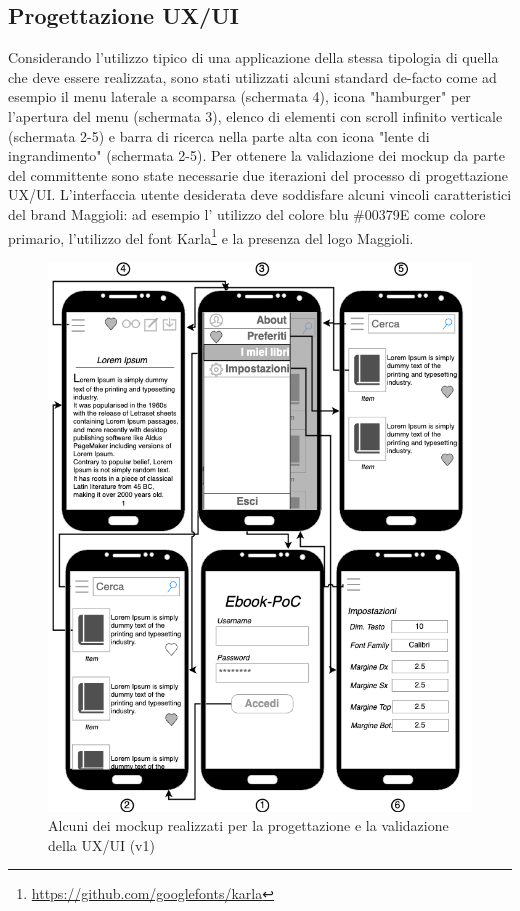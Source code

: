 \subsection{Progettazione UX/UI}
Considerando l'utilizzo tipico di una applicazione della stessa tipologia di quella che deve essere realizzata, sono stati utilizzati alcuni standard de-facto come ad esempio il menu laterale a scomparsa (schermata 4), icona "hamburger" per l'apertura del menu (schermata 3), elenco di elementi con scroll infinito verticale (schermata 2-5) e barra di ricerca nella parte alta con icona "lente di ingrandimento" (schermata 2-5). Per ottenere la validazione dei mockup da parte del committente sono state necessarie due iterazioni del processo di progettazione UX/UI. L'interfaccia utente desiderata deve soddisfare alcuni vincoli caratteristici del brand Maggioli: ad esempio l' utilizzo del colore blu \#00379E come colore primario, l'utilizzo del font Karla\footnote{\url{https://github.com/googlefonts/karla}} e la presenza del logo Maggioli.

\begin{figure}[H]
\centering
\includegraphics[width=1\textwidth]{img/tesi-14-mockup1.drawio.png}
\caption{Alcuni dei mockup realizzati per la progettazione e la validazione della UX/UI (v1)}
\end{figure}

